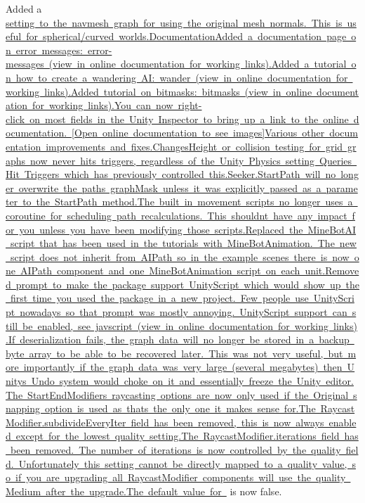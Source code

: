 \begin{DoxyItemize}
\begin{DoxyItemize}
\begin{DoxyItemize}
\item Added a \mbox{\hyperlink{}{setting to the navmesh graph for using the original mesh normals. This is useful for spherical/curved worlds.DocumentationAdded a documentation page on error messages\+: error-\/messages (view in online documentation for working links).Added a tutorial on how to create a wandering A\+I\+: wander (view in online documentation for working links).Added tutorial on bitmasks\+: bitmasks (view in online documentation for working links).You can now right-\/click on most fields in the Unity Inspector to bring up a link to the online documentation. \mbox{[}Open online documentation to see images\mbox{]}Various other documentation improvements and fixes.ChangesHeight or collision testing for grid graphs now never hits triggers, regardless of the Unity Physics setting \textquotesingle{}Queries Hit Triggers\textquotesingle{} which has previously controlled this.Seeker.\+Start\+Path will no longer overwrite the path\textquotesingle{}s graph\+Mask unless it was explicitly passed as a parameter to the Start\+Path method.The built in movement scripts no longer uses a coroutine for scheduling path recalculations. This shouldn\textquotesingle{}t have any impact for you unless you have been modifying those scripts.Replaced the Mine\+Bot\+AI script that has been used in the tutorials with Mine\+Bot\+Animation. The new script does not inherit from A\+I\+Path so in the example scenes there is now one A\+I\+Path component and one Mine\+Bot\+Animation script on each unit.Removed prompt to make the package support Unity\+Script which would show up the first time you used the package in a new project. Few people use Unity\+Script nowadays so that prompt was mostly annoying. Unity\+Script support can still be enabled, see javscript (view in online documentation for working links).If deserialization fails, the graph data will no longer be stored in a backup byte array to be able to be recovered later. This was not very useful, but more importantly if the graph data was very large (several megabytes) then Unity\textquotesingle{}s Undo system would choke on it and essentially freeze the Unity editor.The Start\+End\+Modifier\textquotesingle{}s raycasting options are now only used if the \textquotesingle{}Original\textquotesingle{} snapping option is used as that\textquotesingle{}s the only one it makes sense for.The Raycast\+Modifier.\+subdivide\+Every\+Iter field has been removed, this is now always enabled except for the lowest quality setting.The Raycast\+Modifier.\+iterations field has been removed. The number of iterations is now controlled by the quality field. Unfortunately this setting cannot be directly mapped to a quality value, so if you are upgrading all Raycast\+Modifier components will use the quality Medium after the upgrade.The default value for }} is now false.

\end{DoxyItemize}
\end{DoxyItemize}
\end{DoxyItemize}
